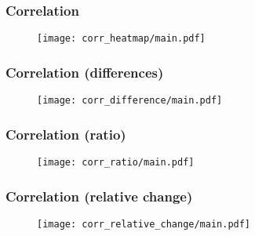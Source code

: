 \begin{frame}
    \frametitle{Correlation}

    \vspace{-15pt}
    \begin{figure}
    \texttt{[image: corr\_heatmap/main.pdf]}
    \end{figure}
\end{frame}

\begin{frame}
    \frametitle{Correlation (differences)}

    \vspace{-15pt}
    \begin{figure}
    \texttt{[image: corr\_difference/main.pdf]}
    \end{figure}
\end{frame}

\begin{frame}
    \frametitle{Correlation (ratio)}

    \vspace{-15pt}
    \begin{figure}
    \texttt{[image: corr\_ratio/main.pdf]}
    \end{figure}
\end{frame}

\begin{frame}
    \frametitle{Correlation (relative change)}

    \vspace{-15pt}
    \begin{figure}
    \texttt{[image: corr\_relative\_change/main.pdf]}
    \end{figure}
\end{frame}
